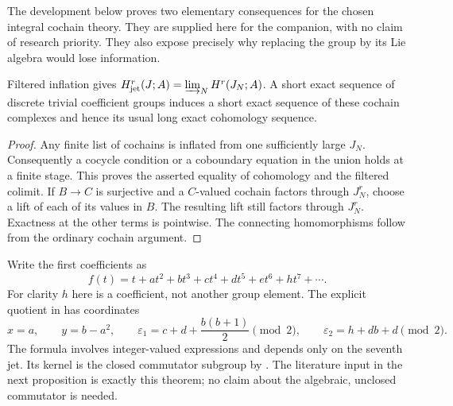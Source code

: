 The development below proves two elementary consequences for the chosen
integral cochain theory. They are supplied here for the companion, with no
claim of research priority. They also expose precisely why replacing the
group by its Lie algebra would lose information.

\begin{lemma}\ours{}
Filtered inflation gives
\(H^r_{\mathrm{jet}}(J;A)=\varinjlim_N H^r(J_N;A)\).
A short exact sequence of discrete trivial coefficient groups induces a
short exact sequence of these cochain complexes and hence its usual long
exact cohomology sequence.
\end{lemma}
\begin{proof}
Any finite list of cochains is inflated from one sufficiently large \(J_N\).
Consequently a cocycle condition or a coboundary equation in the union holds
at a finite stage. This proves the asserted equality of cohomology and the
filtered colimit. If \(B\to C\) is surjective and a \(C\)-valued cochain
factors through \(J_N^r\), choose a lift of each of its values in \(B\).
The resulting lift still factors through \(J_N^r\). Exactness at the other
terms is pointwise. The connecting homomorphisms follow from the ordinary
cochain argument.
\end{proof}

Write the first coefficients as
\[
 f(t)=t+at^2+bt^3+ct^4+dt^5+et^6+ht^7+\cdots.
\]
For clarity \(h\) here is a coefficient, not another group element. The
explicit quotient in \citet[Proposition~2.1]{babenkobogatyi2008substitutions}
has coordinates
\[
 x=a,\qquad y=b-a^2,\qquad
 \varepsilon_1=c+d+\frac{b(b+1)}2\pmod2,\qquad
 \varepsilon_2=h+db+d\pmod2.                 \tag{J1}
\]
The formula involves integer-valued expressions and depends only on the
seventh jet. Its kernel is the closed commutator subgroup by
\citet[Proposition~2.9, pp.~249--250]{babenkobogatyi2008substitutions}.
The literature input in the next proposition is
exactly this theorem; no claim about the algebraic, unclosed commutator is
needed.


